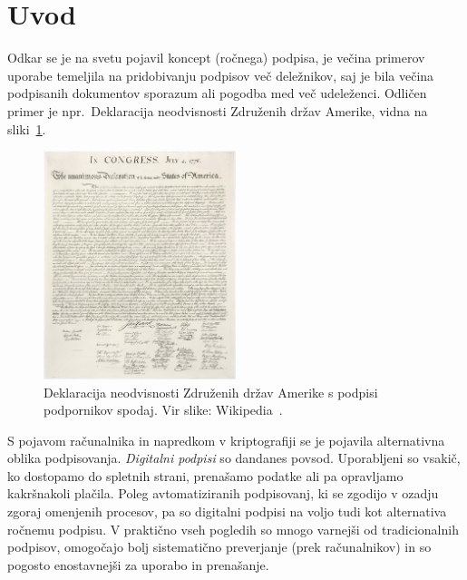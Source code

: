 \section{Uvod}
Odkar se je na svetu pojavil koncept (ročnega) podpisa, je večina primerov uporabe temeljila na
pridobivanju podpisov več deležnikov, saj je bila večina podpisanih dokumentov sporazum ali pogodba
med več udeleženci. Odličen primer je npr.\ Deklaracija neodvisnosti Združenih držav
Amerike, vidna na sliki~\ref{fig:declaration}. 

\begin{figure}[ht]
  \centering
  \includegraphics[width=0.5\textwidth]{images/declaration.jpg}
  \caption[Deklaracija neodvisnosti Združenih držav Amerike.]{Deklaracija neodvisnosti Združenih 
  držav Amerike s podpisi podpornikov spodaj. Vir slike: Wikipedia~\cite{doi}.}
  \label{fig:declaration}
\end{figure}

S pojavom računalnika in napredkom v kriptografiji se je pojavila alternativna oblika podpisovanja.
\textit{Digitalni podpisi} so dandanes povsod. Uporabljeni so vsakič, ko dostopamo do spletnih
strani, prenašamo podatke ali pa opravljamo kakršnakoli plačila. Poleg avtomatiziranih podpisovanj,
ki se zgodijo v ozadju zgoraj omenjenih procesov, pa so digitalni podpisi na voljo tudi kot alternativa
ročnemu podpisu. V praktično vseh pogledih so mnogo varnejši od tradicionalnih podpisov,
omogočajo bolj sistematično preverjanje (prek računalnikov) in so pogosto enostavnejši za uporabo
in prenašanje.


